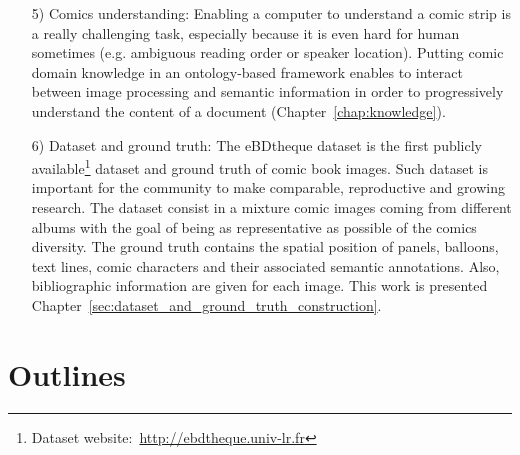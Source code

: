 \begin{itemize}
	

	\item [5)] Comics understanding: Enabling a computer to understand a comic strip is a really challenging task, especially because it is even hard for human sometimes (e.g. ambiguous reading order or speaker location).
	Putting comic domain knowledge in an ontology-based framework enables to interact between image processing and semantic information in order to progressively understand the content of a document (Chapter~\ref{chap:knowledge}).

	\item[6)] Dataset and ground truth: The eBDtheque dataset is the first publicly available\footnote{Dataset website:~\url{http://ebdtheque.univ-lr.fr}} dataset and ground truth of comic book images.
	Such dataset is important for the community to make comparable, reproductive and growing research.
	The dataset consist in a mixture comic images coming from different albums with the goal of being as representative as possible of the comics diversity.
	The ground truth contains the spatial position of panels, balloons, text lines, comic characters and their associated semantic annotations.
	Also, bibliographic information are given for each image.
	This work is presented Chapter~\ref{sec:dataset_and_ground_truth_construction}.


\end{itemize}


\section{Outlines}

